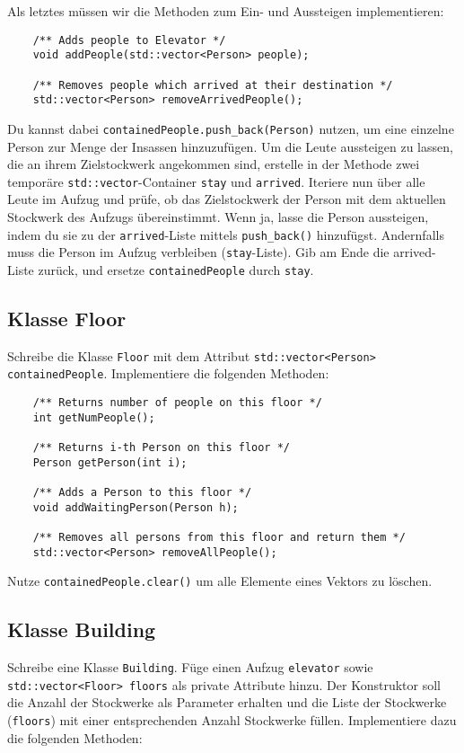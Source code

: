 Als letztes müssen wir die Methoden zum Ein- und Aussteigen implementieren:
\begin{lstlisting}
	/** Adds people to Elevator */
	void addPeople(std::vector<Person> people);

	/** Removes people which arrived at their destination */
	std::vector<Person> removeArrivedPeople();
\end{lstlisting}

Du kannst dabei \texttt{containedPeople.push\_back(Person)} nutzen, um eine einzelne Person zur Menge der Insassen hinzuzufügen.
Um die Leute aussteigen zu lassen, die an ihrem Zielstockwerk angekommen sind, erstelle in der Methode zwei temporäre \texttt{std::vector}-Container \texttt{stay} und \texttt{arrived}.
Iteriere nun über alle Leute im Aufzug und prüfe, ob das Zielstockwerk der Person mit dem aktuellen Stockwerk des Aufzugs übereinstimmt.
Wenn ja, lasse die Person aussteigen, indem du sie zu der \texttt{arrived}-Liste mittels \texttt{push\_back()} hinzufügst.
Andernfalls muss die Person im Aufzug verbleiben (\texttt{stay}-Liste).
Gib am Ende die arrived-Liste zurück, und ersetze \texttt{containedPeople} durch \texttt{stay}.

\subsection{Klasse Floor}
Schreibe die Klasse \texttt{Floor} mit dem Attribut \texttt{std::vector<Person> containedPeople}.
Implementiere die folgenden Methoden:

\begin{lstlisting}
	/** Returns number of people on this floor */
	int getNumPeople();
	
	/** Returns i-th Person on this floor */
	Person getPerson(int i);
	
	/** Adds a Person to this floor */
	void addWaitingPerson(Person h);
	
	/** Removes all persons from this floor and return them */
	std::vector<Person> removeAllPeople();
\end{lstlisting}


Nutze \texttt{containedPeople.clear()} um alle Elemente eines Vektors zu löschen.

\subsection{Klasse Building}
Schreibe eine Klasse \texttt{Building}.
Füge einen Aufzug \texttt{elevator} sowie \texttt{std::vector<Floor> floors} als private Attribute hinzu.
Der Konstruktor soll die Anzahl der Stockwerke als Parameter erhalten und die Liste der Stockwerke (\texttt{floors}) mit einer entsprechenden Anzahl Stockwerke füllen.
Implementiere dazu die folgenden Methoden:

